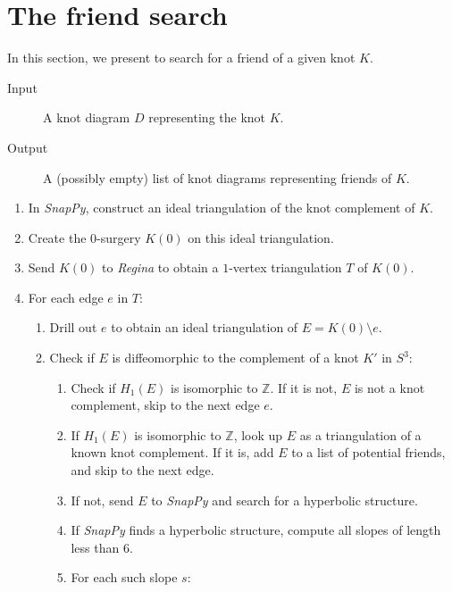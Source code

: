 \documentclass{amsart} %
\newcommand{\Z}{\mathbb{Z}}
\theoremstyle{thm}
\theoremstyle{definition}
\numberwithin{equation}{section}
\begin{document}
\section{The friend search}\label{sec:friend_search}

In this section, we present  to search for a friend of a given knot $K$. 

\begin{algorithm}
\caption{Algorithm to search for friends of a given knot $K$.}
\label{alg:friend_search}
\begin{description}
    \item[Input] A knot diagram $D$ representing the knot $K$.
    \item[Output] A (possibly empty) list of knot diagrams representing friends of $K$.
\end{description}
\begin{enumerate}
    \item In {\em SnapPy}, construct an ideal triangulation of the knot complement of $K$.
    \item Create the $0$-surgery $K(0)$ on this ideal triangulation.
    \item Send $K(0)$ to {\em Regina} to obtain a $1$-vertex triangulation $T$ of $K(0)$. 
    \item For each edge $e$ in $T$:
    \begin{enumerate}
        \item Drill out $e$ to obtain an ideal triangulation of $E=K(0)\setminus e$.
        \item Check if $E$ is diffeomorphic to the complement of a knot $K'$ in $S^3$:
            \begin{enumerate}
                \item Check if $H_1(E)$ is isomorphic to $\Z$. If it is not, $E$ is not a knot complement, skip to the next edge $e$.
                \item If $H_1(E)$ is isomorphic to $\Z$, look up $E$ as a triangulation of a known knot complement. If it is, add $E$ to a list of potential friends, and skip to the next edge.
                \item If not, send $E$ to {\em SnapPy} and search for a hyperbolic structure.
                \item If {\em SnapPy} finds a hyperbolic structure, compute all slopes of length less than $6$. 
                \item For each such slope $s$:
                \begin{enumerate}

\end{enumerate}
\end{enumerate}
\end{enumerate}
\end{enumerate}
\end{algorithm}
\end{document}

